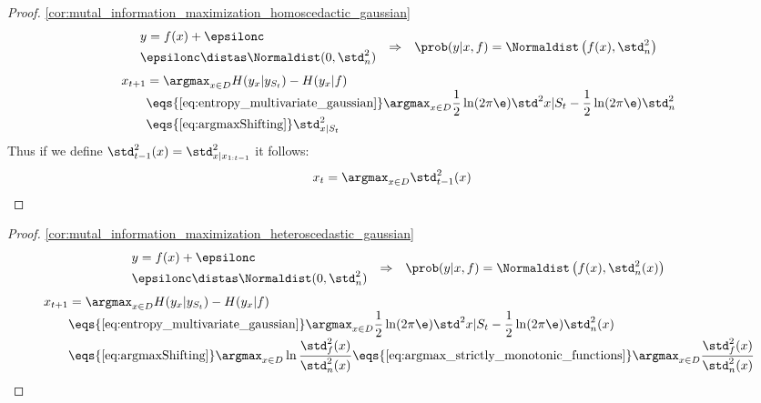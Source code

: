 \begin{proofbox}\nospacing
  \begin{proof}\cref{cor:mutal_information_maximization_homoscedactic_gaussian}
    \label{proof:cor:mutal_information_maximization_homoscedactic_gaussian}
    \begin{align*}
      \begin{aligned}
        &y=f(x)+\epsilonc\\
        &\epsilonc\distas\Normaldist(0,\std_n^2)
      \end{aligned}&&\Rightarrow&&\prob(y|x,f)=\Normaldist\left(f(x),\std_n^2\right)
    \end{align*}
    \begin{align*}
          x_{t+1}&=\argmax_{x\in D}H(y_x|y_{S_t})-H(y_x|f)\\[-1\jot]
                 &\eqs{\text{\cref{eq:entropy_multivariate_gaussian}}}
                   \argmax_{x\in D}
                   \frac{1}{2}\ln(2\pi\e)\std^2{x|S_t}-\frac{1}{2}\ln(2\pi\e)\std^2_{n}\\[-1\jot]
                 &\eqs{\text{\cref{eq:argmaxShifting}}}\std_{x|S_t}^2
    \end{align*}
    Thus if we define $\std_{t-1}^2(x)=\std_{x|x_{1:t-1}}^2$ it follows:
    \begin{align}
      x_{t}&=\argmax_{x\in D}\std_{t-1}^2(x)
    \end{align}
  \end{proof}
\end{proofbox}
\begin{proofbox}\nospacing
  \begin{proof}\cref{cor:mutal_information_maximization_heteroscedastic_gaussian}
    \label{proof:cor:mutal_information_maximization_heteroscedastic_gaussian}
    \begin{align*}
      \begin{aligned}
        &y=f(x)+\epsilonc\\
        &\epsilonc\distas\Normaldist(0,\std_n^2)
      \end{aligned}&&\Rightarrow&&\prob(y|x,f)=\Normaldist\left(f(x),\std_n^2(x)\right)
    \end{align*}
    \begin{align*}
          x_{t+1}&=\argmax_{x\in D}H(y_x|y_{S_t})-H(y_x|f)\\[-1\jot]
                 &\eqs{\text{\cref{eq:entropy_multivariate_gaussian}}}
                   \argmax_{x\in D}
                   \frac{1}{2}\ln(2\pi\e)\std^2{x|S_t}-\frac{1}{2}\ln(2\pi\e)\std^2_{n}(x)\\[-1\jot]
                 &\eqs{\text{\cref{eq:argmaxShifting}}}\argmax_{x\in D}
                   \ln\frac{\std_f^2(x)}{\std_n^2(x)}
                 \eqs{\text{\cref{eq:argmax_strictly_monotonic_functions}}}\argmax_{x\in D}
                    \frac{\std_f^2(x)}{\std_n^2(x)}
    \end{align*}
  \end{proof}
\end{proofbox}

